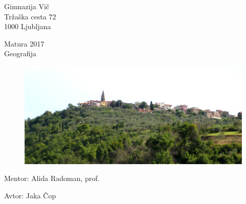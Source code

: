 \documentclass[12pt]{article}
\begin{document}
\parbox[t]{100pt}{\noindent Gimnazija Vič\\Tržaška cesta 72\\1000 Ljubljana}%
\hfill%
\parbox[t]{8em}{\noindent Matura 2017\\Geografija}
%
\vfill\vfill\vfill
%
%

\begin{figure}[!htbp]
  \centering
  \includegraphics[width=1.0\textwidth]{./Slike/Padna1.jpg}\\
  \label{gb}
\end{figure}

\vfill\vfill\vfill
%
\parbox[t]{200pt}{\noindent Mentor: Alida Radoman, prof.}%
\hfill%
\parbox[t]{8em}{\noindent Avtor: Jaka Čop}
\end{document}
